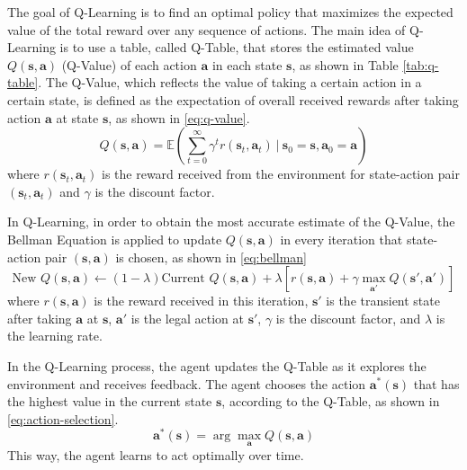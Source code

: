 \documentclass[10pt,a4paper]{article}
\begin{document}
The goal of Q-Learning is to find an optimal policy that maximizes the expected value of the total reward over any sequence of actions. The main idea of Q-Learning is to use a table, called Q-Table, that stores the estimated value $Q(\boldsymbol{s}, \boldsymbol{a})$ (Q-Value) of each action $\boldsymbol{a}$ in each state $\boldsymbol{s}$, as shown in Table \ref{tab:q-table}. The Q-Value, which reflects the value of taking a certain action in a certain state, is defined as the expectation of overall received rewards after taking action $\boldsymbol{a}$ at state $\boldsymbol{s}$, as shown in \eqref{eq:q-value}. 
\begin{equation}
	Q(\boldsymbol{s}, \boldsymbol{a}) = \mathbb{E}\left(\sum_{t = 0}^{\infty} \gamma^{t}r(\boldsymbol{s}_{t}, \boldsymbol{a}_{t}) ~\left|~ \boldsymbol{s}_{0} = \boldsymbol{s}, \boldsymbol{a}_{0} = \boldsymbol{a}\right.\right)
	\label{eq:q-value}
\end{equation}
where $r(\boldsymbol{s}_{t}, \boldsymbol{a}_{t})$ is the reward received from the environment for state-action pair $(\boldsymbol{s}_{t}, \boldsymbol{a}_{t})$ and $\gamma$ is the discount factor. 

In Q-Learning, in order to obtain the most accurate estimate of the Q-Value,  the Bellman Equation is applied to update $Q(\boldsymbol{s}, \boldsymbol{a})$ in every iteration that state-action pair $(\boldsymbol{s}, \boldsymbol{a})$ is chosen, as shown in \eqref{eq:bellman}
\begin{equation}
	\text{New~} Q(\boldsymbol{s}, \boldsymbol{a}) \leftarrow (1-\lambda)\text{Current~} Q(\boldsymbol{s}, \boldsymbol{a}) + \lambda \left[ r(\boldsymbol{s}, \boldsymbol{a}) + \gamma \max_{\boldsymbol{a'}}Q(\boldsymbol{s'}, \boldsymbol{a'})\right]
	\label{eq:bellman}
\end{equation}
where $r(\boldsymbol{s}, \boldsymbol{a})$ is the reward received in this iteration, $\boldsymbol{s'}$ is the transient state after taking $\boldsymbol{a}$ at $\boldsymbol{s}$, $\boldsymbol{a'}$ is the legal action at $\boldsymbol{s'}$, $\gamma$ is the discount factor, and $\lambda$ is the learning rate. 

In the Q-Learning process, the agent updates the Q-Table as it explores the environment and receives feedback. The agent chooses the action $\boldsymbol{a}^{*}(\boldsymbol{s})$ that has the highest value in the current state $\boldsymbol{s}$, according to the Q-Table, as shown in \eqref{eq:action-selection}.  
\begin{equation}
	\boldsymbol{a}^{*}(\boldsymbol{s}) = \arg\max_{\boldsymbol{a}}Q(\boldsymbol{s}, \boldsymbol{a})
	\label{eq:action-selection}
\end{equation}
This way, the agent learns to act optimally over time.
\end{document}

